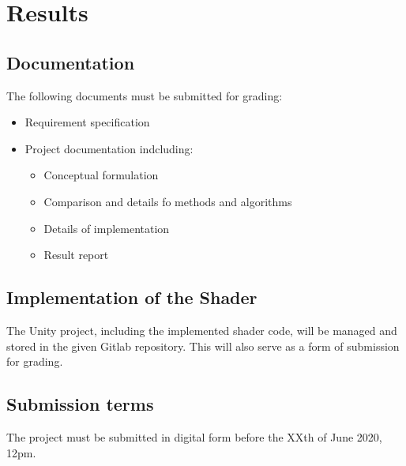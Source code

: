 \section{Results}

\subsection{Documentation}
The following documents must be submitted for grading:
\begin{itemize}
    \item Requirement specification
    \item Project documentation indcluding:
    \begin{itemize}
        \item Conceptual formulation
        \item Comparison and details fo methods and algorithms
        \item Details of implementation
        \item Result report
    \end{itemize}
\end{itemize}

\subsection{Implementation of the Shader}
The Unity project, including the implemented shader code, will be managed and stored in the given Gitlab repository\cite{gitlab-repo}. This will also serve as a form of submission for grading.

\subsection{Submission terms}
The project must be submitted in digital form before the XXth of June 2020, 12pm.
